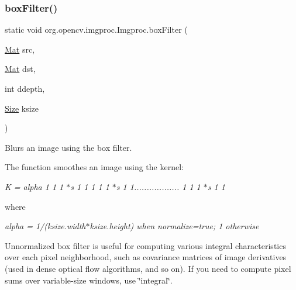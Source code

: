 \subsubsection{\texorpdfstring{box\+Filter()}{boxFilter()}\hspace{0.1cm}{\footnotesize\ttfamily [3/3]}}
{\footnotesize\ttfamily static void org.\+opencv.\+imgproc.\+Imgproc.\+box\+Filter (\begin{DoxyParamCaption}\item[{\mbox{\hyperlink{classorg_1_1opencv_1_1core_1_1_mat}{Mat}}}]{src,  }\item[{\mbox{\hyperlink{classorg_1_1opencv_1_1core_1_1_mat}{Mat}}}]{dst,  }\item[{int}]{ddepth,  }\item[{\mbox{\hyperlink{classorg_1_1opencv_1_1core_1_1_size}{Size}}}]{ksize }\end{DoxyParamCaption})\hspace{0.3cm}{\ttfamily [static]}}

Blurs an image using the box filter.

The function smoothes an image using the kernel\+:

{\itshape K = alpha 1 1 1 $\ast$s 1 1 1 1 1 $\ast$s 1 1.................. 1 1 1 $\ast$s 1 1 }

where

{\itshape alpha = 1/(ksize.\+width$\ast$ksize.height) when normalize=true; 1 otherwise}

Unnormalized box filter is useful for computing various integral characteristics over each pixel neighborhood, such as covariance matrices of image derivatives (used in dense optical flow algorithms, and so on). If you need to compute pixel sums over variable-\/size windows, use \char`\"{}integral\char`\"{}.


